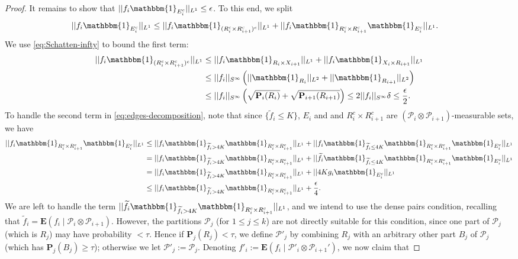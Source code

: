\documentclass[reqno,11pt]{amsart}
\theoremstyle{definition}
\theoremstyle{remark}
\numberwithin{equation}{section}
\renewcommand{\P}{\mathbf{P}}
\newcommand{\E}{\mathbf{E}}
\newcommand{\mP}{\mathcal{P}}
\newcommand{\one}{\mathbbm{1}}
\renewcommand{\tilde}{\widetilde}
\begin{document}
\begin{proof}
It remains to show that $||f_{i}\one_{E_{i}^c}||_{L^1} \le \epsilon$. To this end, we split
\begin{equation} \label{eq:edges-decomposition}
\begin{aligned}
    ||f_{i}\one_{E_{i}^c}||_{L^1} 
    &\le
    ||f_i\one_{(R_i^c \times R_{i+1}^c)^c}||_{L^1}
    +
    ||f_i\one_{R_i^c \times R_{i+1}^c}\one_{E_{i}^c}||_{L^1}.
\end{aligned}
\end{equation}
We use \cref{eq:Schatten-infty} to bound the first term:
\begin{equation} \label{eq:edges-first-term}
\begin{aligned}
    ||f_i\one_{(R_i^c \times R_{i+1}^c)^c}||_{L^1}
    &\le 
    ||f_i\one_{R_i \times X_{i+1}}||_{L^1}
    +
    ||f_i\one_{X_i \times R_{i+1}}||_{L^1}
    \\
    &\le ||f_i||_{S^\infty} \left(||\one_{R_i}||_{L^2} + ||\one_{R_{i+1}}||_{L^2}  \right)
    \\
    &\le 
    ||f_i||_{S^\infty} \left(\sqrt{\P_i(R_i)} + \sqrt{\P_{i+1}(R_{i+1})} \right)
    \le 
    2 ||f_i||_{S^{\infty}} \delta
    \le \frac{\epsilon}{2}.
\end{aligned}
\end{equation}
To handle the second term in \cref{eq:edges-decomposition}, note that since $\{\tilde{f}_i \le K\}$, $E_i$ and and $R_i^c \times R_{i+1}^c$ are $(\mP_i \otimes \mP_{i+1})$-measurable sets, we have
\begin{equation} \label{eq:edges-second-term}
\begin{aligned}
    ||f_i\one_{R_i^c \times R_{i+1}^c}\one_{E_{i}^c}||_{L^1} &\le 
    ||f_i\one_{\tilde{f}_i >4K} \one_{R_i^c \times R_{i+1}^c}||_{L^1}
    +
    ||f_i\one_{\tilde{f}_i \le 4K} \one_{R_i^c \times R_{i+1}^c} \one_{E_i^c}||_{L^1}
    \\
    &= 
    ||f_i\one_{\tilde{f}_i >4K} \one_{R_i^c \times R_{i+1}^c}||_{L^1}
    +
    ||\tilde{f}_i\one_{\tilde{f}_i \le 4K} \one_{R_i^c \times R_{i+1}^c} \one_{E_i^c}||_{L^1}
    \\
    &=
    ||f_i \one_{\tilde{f}_i >4K} \one_{R_i^c \times R_{i+1}^c}||_{L^1}
    +
    ||4K g_i \one_{E_i^c}||_{L^1}
    \\
    &\le 
    ||f_i \one_{\tilde{f}_i >4K} \one_{R_i^c \times R_{i+1}^c}||_{L^1} + \frac{\epsilon}{4}.
\end{aligned}
\end{equation}
We are left to handle the term $||\tilde{f}_i\one_{\tilde{f}_i >4K} \one_{R_i^c \times R_{i+1}^c}||_{L^1}$, and we intend to use the dense pairs condition, recalling that $\tilde{f}_i = \E(f_i \mid \mP_i \otimes \mP_{i+1})$. However, the partitions $\mP_j$ (for $1 \le j \le k$) are not directly suitable for this condition, since one part of $\mP_j$ (which is $R_j$) may have probability $< \tau$. Hence if $\P_j(R_j) < \tau$, we define $\mP'_j$ by combining $R_j$ with an arbitrary other part $B_j$ of $\mP_j$ (which has $\P_j(B_j) \ge \tau$); otherwise we let $\mP'_j := \mP_j$. Denoting $f'_i := \E(f_i \mid \mP'_i \otimes \mP_{i+1}')$, we now claim that

\end{proof}
\end{document}
